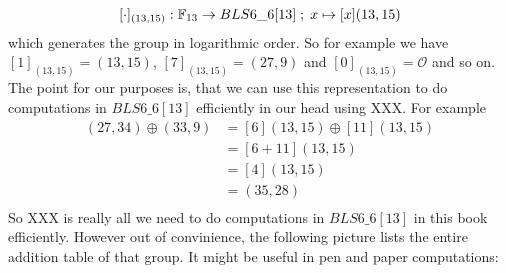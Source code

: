 $$
[\cdot]_{(13,15)}: \mathbb{F}_{13} \to BLS6\_6[13]\;;\; x \mapsto [x](13,15)
$$
which generates the group in logarithmic order. So for example we have $[1]_{(13,15)}= (13,15)$, $[7]_{(13,15)}= (27,9)$ and $[0]_{(13,15)}= \mathcal{O}$ and so on. The point for our purposes is, that we can use this representation to do computations in $BLS6\_6[13]$ efficiently in our head using XXX. For example
\begin{align*}
(27,34)\oplus (33,9)  & = [6](13,15)\oplus [11](13,15)\\
                      & = [6+11](13,15)\\
                      & = [4](13,15)\\
                      & = (35,28)\\
\end{align*}
So XXX is really all we need to do computations in $BLS6\_6[13]$ in this book efficiently. However out of convinience, the following picture lists the entire addition table of that group. It might be useful in pen and paper computations:
\begingroup
    \fontsize{5pt}{5pt}\selectfont
